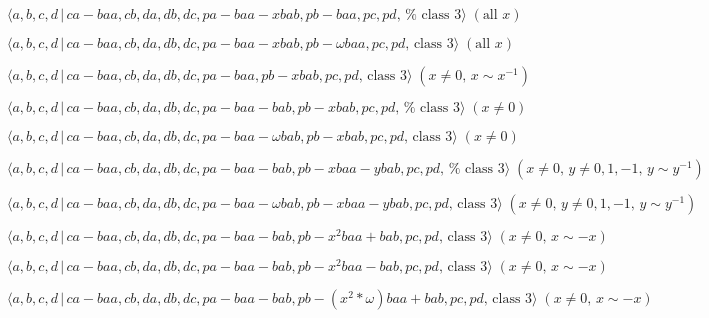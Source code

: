 \documentclass[10pt]{article}
\begin{document}
\begin{equation}
\langle a,b,c,d\,|\,ca-baa,cb,da,db,dc,pa-baa-xbab,pb-baa,pc,pd,\,\text{%
class }3\rangle \;(\text{all }x)  \tag{7.3348}
\end{equation}

\begin{equation}
\langle a,b,c,d\,|\,ca-baa,cb,da,db,dc,pa-baa-xbab,pb-\omega baa,pc,pd,\,%
\text{class }3\rangle \;(\text{all }x)  \tag{7.3349}
\end{equation}

\begin{equation}
\langle a,b,c,d\,|\,ca-baa,cb,da,db,dc,pa-baa,pb-xbab,pc,pd,\,\text{class }%
3\rangle \;(x\neq 0,\,x\sim x^{-1})  \tag{7.3350}
\end{equation}

\begin{equation}
\langle a,b,c,d\,|\,ca-baa,cb,da,db,dc,pa-baa-bab,pb-xbab,pc,pd,\,\text{%
class }3\rangle \;(x \neq 0)  \tag{7.3351}
\end{equation}

\begin{equation}
\langle a,b,c,d\,|\,ca-baa,cb,da,db,dc,pa-baa-\omega bab,pb-xbab,pc,pd,\,%
\text{class }3\rangle \;(x\neq 0)  \tag{7.3352}
\end{equation}

\begin{equation}
\langle a,b,c,d\,|\,ca-baa,cb,da,db,dc,pa-baa-bab,pb-xbaa-ybab,pc,pd,\,\text{%
class }3\rangle \;(x\neq 0,\,y\neq 0,1,-1,\,y\sim y^{-1})  \tag{7.3353}
\end{equation}

\begin{equation}
\langle a,b,c,d\,|\,ca-baa,cb,da,db,dc,pa-baa-\omega
bab,pb-xbaa-ybab,pc,pd,\,\text{class }3\rangle \;(x\neq 0,\,y\neq
0,1,-1,\,y\sim y^{-1})  \tag{7.3354}
\end{equation}

\begin{equation}
\langle a,b,c,d\,|\,ca-baa,cb,da,db,dc,pa-baa-bab,pb-x^{2}baa+bab,pc,pd,\,%
\text{class }3\rangle \;(x\neq 0,\,x\sim -x)  \tag{7.3355}
\end{equation}

\begin{equation}
\langle a,b,c,d\,|\,ca-baa,cb,da,db,dc,pa-baa-bab,pb-x^{2}baa-bab,pc,pd,\,%
\text{class }3\rangle \;(x\neq 0,\,x\sim -x)  \tag{7.3356}
\end{equation}

\begin{equation}
\langle a,b,c,d\,|\,ca-baa,cb,da,db,dc,pa-baa-bab,pb-(x^{2}\ast \omega
)baa+bab,pc,pd,\,\text{class }3\rangle \;(x\neq 0,\,x\sim -x)  \tag{7.3357}
\end{equation}
\end{document}

